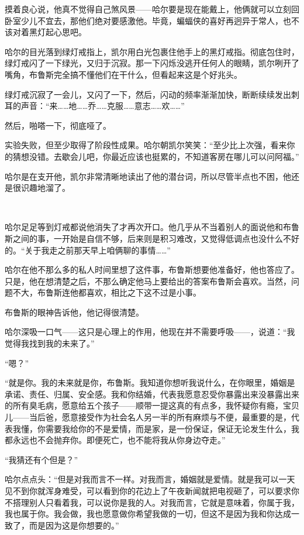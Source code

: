 \documentclass[../main]{subfiles}
\begin{document}
摸着良心说，他真不觉得自己煞风景——哈尔要是现在能戴上，他俩就可以立刻回卧室少儿不宜去，那他们绝对要感激他。毕竟，蝙蝠侠的喜好再迥异于常人，也不该对着黑灯起心思吧。

哈尔的目光落到绿灯戒指上，凯尔用白光包裹住他手上的黑灯戒指。彻底包住时，绿灯戒闪了一下绿光，又归于沉寂。那一下闪烁没逃开任何人的眼睛，凯尔咧开了嘴角，布鲁斯完全搞不懂他们在干什么，但看起来这是个好兆头。

绿灯戒沉寂了一会儿，又闪了一下，然后，闪动的频率渐渐加快，断断续续发出刺耳的声音：“来……地……乔……克服……意志……欢……”

然后，啪嗒一下，彻底哑了。

实验失败，但至少取得了阶段性成果。哈尔朝凯尔笑笑：“至少比上次强，看来你的猜想没错。去歇会儿吧，你最近应该也挺累的，不知道客房在哪儿可以问阿福。”

哈尔是在支开他，凯尔非常清晰地读出了他的潜台词，所以尽管半点也不困，他还是很识趣地溜了。

~\

哈尔足足等到灯戒都说他消失了才再次开口。他几乎从不当着别人的面说他和布鲁斯之间的事，一开始是自信不够，后来则是积习难改，又觉得低调点也没什么不好的。“关于我走之前那天早上咱俩聊的事情……”

哈尔在他不那么多的私人时间里想了这件事，布鲁斯想要他准备好，他也答应了。只是，他在想清楚之后，不那么确定他马上要给出的答案布鲁斯会喜欢。当然，问题不大，布鲁斯连他都喜欢，相比之下这不过是小事。

布鲁斯的眼神告诉他，他记得很清楚。

哈尔深吸一口气——这只是心理上的作用，他现在并不需要呼吸——，说道：“我觉得我找到我的未来了。”

“嗯？”

“就是你。我的未来就是你，布鲁斯。我知道你想听我说什么，在你眼里，婚姻是承诺、责任、归属、安全感。我和你结婚，代表我愿意忍受你暴露出来没暴露出来的所有臭毛病，愿意给五个孩子——顺带一提这真的有点多，我怀疑你有瘾，宝贝儿——当后爸，愿意接受作为社会名人另一半的所有麻烦与不便，最重要的是，代表我懂，你需要我给你的不是爱情，而是家，是一份保证，保证无论发生什么，我都永远也不会抛弃你。即便死亡，也不能将我从你身边夺走。”

“我猜还有个但是？”

哈尔点点头：“但是对我而言不一样。对我而言，婚姻就是爱情。就是我可以一天见不到你就浑身难受，可以看到你的花边上了午夜新闻就把电视砸了，可以要求你不搭理别人只看着我，可以说你是我的人。对我而言，它就是意味着，你属于我，我也属于你。我会做，我也愿意做你希望我做的一切，但这不是因为我和你达成一致了，而是因为这是你想要的。”
\end{document}

